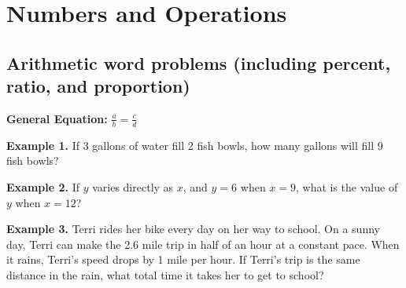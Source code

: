 \chapter{Numbers and Operations}

\section{Arithmetic word problems (including percent, ratio, and proportion)}

\bigskip
\textbf{General Equation:} $\frac{a}{b}=\frac{c}{d}$

\vfill
\textbf{Example 1.} If 3 gallons of water fill 2 fish bowls, how many gallons will fill 9 fish bowls?

\vfill
\textbf{Example 2.} If $y$ varies directly as $x$, and $y=6$ when $x=9$, what is the value of $y$ when $x=12$?

\vfill
\textbf{Example 3.} Terri rides her bike every day on her way to school. On a sunny day, Terri can make the 2.6 mile trip in half of an hour at a constant pace. When it rains, Terri's speed drops by 1 mile per hour. If Terri's trip is the same distance in the rain, what total time it takes her to get to school?

\vfill
\newpage
\setlength{\columnseprule}{1pt}


